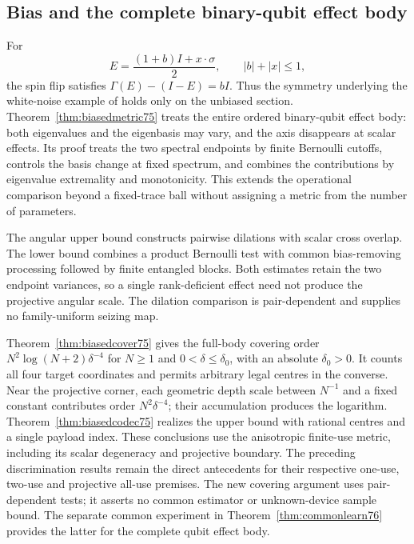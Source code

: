 \subsection{Bias and the complete binary-qubit effect body}
For
\[
 E=\frac{(1+b)I+x\cdot\sigma}{2},\qquad |b|+|x|\leq1,
\]
the spin flip satisfies $\Gamma(E)-(I-E)=bI$. Thus the symmetry
underlying the white-noise example of \cite{SZ74} holds only on the
unbiased section. Theorem~\ref{thm:biasedmetric75} treats the entire
ordered binary-qubit effect body: both eigenvalues and the eigenbasis
may vary, and the axis disappears at scalar effects. Its proof treats
the two spectral endpoints by finite Bernoulli cutoffs, controls the
basis change at fixed spectrum, and combines the contributions by
eigenvalue extremality and monotonicity. This extends the operational
comparison beyond a fixed-trace ball without assigning a metric from
the number of parameters.

The angular upper bound constructs pairwise dilations with scalar
cross overlap. The lower bound combines a product Bernoulli test with
common bias-removing processing followed by finite entangled blocks.
Both estimates retain the two endpoint variances, so a single
rank-deficient effect need not produce the projective angular scale.
The dilation comparison is pair-dependent and supplies no
family-uniform seizing map.

Theorem~\ref{thm:biasedcover75} gives the full-body covering order
$N^2\log(N+2)\delta^{-4}$ for $N\ge1$ and
$0<\delta\le\delta_0$, with an absolute $\delta_0>0$.
It counts all four target coordinates and permits arbitrary legal
centres in the converse. Near the projective corner, each geometric
depth scale between $N^{-1}$ and a fixed constant contributes order
$N^2\delta^{-4}$; their accumulation produces the logarithm.
Theorem~\ref{thm:biasedcodec75} realizes the upper bound with rational
centres and a single payload index. These conclusions use the
anisotropic finite-use metric, including its scalar degeneracy and
projective boundary.
The preceding discrimination results remain the direct antecedents
for their respective one-use, two-use and projective all-use premises.
The new covering argument uses pair-dependent tests; it asserts no
common estimator or unknown-device sample bound.
The separate common experiment in Theorem~\ref{thm:commonlearn76}
provides the latter for the complete qubit effect body.
